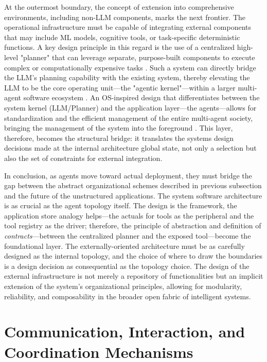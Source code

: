 \documentclass[11pt,a4paper]{article}
\begin{document}
At the outermost boundary, the concept of extension into comprehensive environments, including non-LLM components, marks the next frontier. The operational infrastructure must be capable of integrating external components that may include ML models, cognitive tools, or task-specific deterministic functions. A key design principle in this regard is the use of a centralized high-level "planner" that can leverage separate, purpose-built components to execute complex or computationally expensive tasks \cite{arxiv:2406.00584v1}. Such a system can directly bridge the LLM's planning capability with the existing system, thereby elevating the LLM to be the core operating unit---the "agentic kernel"---within a larger multi-agent software ecosystem \cite{arxiv:2312.03815v2}. An OS-inspired design that differentiates between the system kernel (LLM/Planner) and the application layer---the agents---allows for standardization and the efficient management of the entire multi-agent society, bringing the management of the system into the foreground \cite{arxiv:2406.11342v3}. This layer, therefore, becomes the structural bridge: it translates the systems design decisions made at the internal architecture global state, not only a selection but also the set of constraints for external integration.

In conclusion, as agents move toward actual deployment, they must bridge the gap between the abstract organizational schemes described in previous subsection and the future of the unstructured applications. The system software architecture is as crucial as the agent topology itself. The design is the framework, the application store analogy helps---the actuals for tools as the peripheral and the tool registry as the driver; therefore, the principle of abstraction and definition of \emph{contracts}---between the centralized planner and the exposed tool---become the foundational layer. The externally-oriented architecture must be as carefully designed as the internal topology, and the choice of where to draw the boundaries is a design decision as consequential as the topology choice. The design of the external infrastructure is not merely a repository of functionalities but an implicit extension of the system's organizational principles, allowing for modularity, reliability, and composability in the broader open fabric of intelligent systems.


\section{Communication, Interaction, and Coordination Mechanisms}
\end{document}
